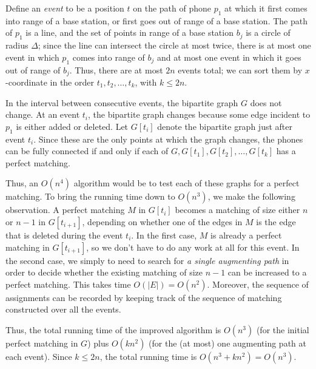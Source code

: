 \documentclass[12pt]{article}
\begin{document}
\begin{enumerate}
{Define an {\em event} to be a position $t$ on the path of phone $p_1$ 
at which it first comes into range of a base station, 
or first goes out of range of a base station.
The path of $p_1$ is a line, and 
the set of points in range of a base station
$b_j$ is a circle of radius $\Delta$;
since the line can intersect the circle at most twice,
there is at most one event in which $p_1$ comes into range of $b_j$
and at most one event in which it goes out of range of $b_j$.
Thus, there are at most $2n$ events total; we
can sort them by $x$-coordinate in the order $t_1, t_2, \ldots, t_k$,
with $k \leq 2n$.

In the interval between consecutive events, 
the bipartite graph $G$ does not change.
At an event $t_i$, the bipartite graph changes because some
edge incident to $p_1$ is either added or deleted.
Let $G[t_i]$ denote the bipartite graph just after event $t_i$.
Since these are the only points at which the graph changes,
the phones can be fully connected if and only if 
each of $G, G[t_1], G[t_2], \ldots, G[t_k]$ has a perfect matching.

Thus, an $O(n^4)$ algorithm would be to test each of
these graphs for a perfect matching.
To bring the running time down to $O(n^3)$, we make
the following observation.
A perfect matching $M$ in $G[t_i]$ becomes a matching
of size either $n$ or $n-1$ in $G[t_{i+1}]$,
depending on whether one of the edges in $M$ 
is the edge that is deleted during the event $t_i$.
In the first case, $M$ is already a perfect matching in $G[t_{i+1}]$,
so we don't have to do any work at all for this event.
In the second case, we simply to need to search for {\em a single 
augmenting path} in order to decide whether the
existing matching of size $n-1$ can be increased to a perfect matching.
This takes time $O(|E|) = O(n^2)$.
Moreover, the sequence of assignments can be recorded
by keeping track of the sequence of matching constructed
over all the events.

Thus, the total running time of the improved algorithm
is $O(n^3)$ (for the initial perfect matching in $G$)
plus $O(kn^2)$ (for the (at most) one augmenting path
at each event).
Since $k \leq 2n$, the total running time is $O(n^3 + kn^2) = O(n^3)$.

}


\end{enumerate}
\end{document}
